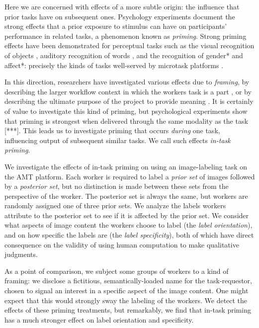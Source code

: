 \documentclass[a4paper]{report}
\begin{document}
Here we are concerned with effects of a more subtle origin: the influence that
prior tasks have on subsequent ones.  Psychology experiments document the 
strong effects that a prior exposure to stimulus can have on participants' 
performance in related tasks, a phenomenon known as \textit{priming}.  Strong 
priming effects have been demonstrated for
perceptual tasks such as the visual recognition of 
objects \cite{BJOP:BJOP1796},
auditory recognition of words \cite{BJOP:BJOP1826}, and the recognition
of gender* and affect*: precisely the kinds of tasks well-served by microtask 
platforms \cite{yuen2011survey, snow2008cheap}.  

In this direction, researchers have investigated various effects due to 
\textit{framing}, by describing the larger workflow context in which the 
workers task is a part \cite{Kinnaird2012281}, or by describing the ultimate 
purpose of the project to provide meaning \cite{chandler2013breaking}.
It is certainly of value to investigate this kind of priming, but 
psychological experiments show that priming is strongest when 
delivered through the same modality as the task [***].  This leads us to 
investigate priming that occurs \textit{during} one task, influencing output
of subsequent similar tasks. We call such effects \textit{in-task priming}.  

We investigate the effects of in-task priming on using an image-labeling task
on the AMT platform.  Each worker is required to label a \textit{prior set} of
images followed by a \textit{posterior set}, but no distinction is made between
these sets from the perspective of the worker.  The posterior set is
always the same, but workers are randomly assigned one of three prior sets.
We analyze the labels workers attribute to the posterior set to see if it is 
affected by the prior set.  We consider what aspects of image content the 
workers choose to label (the \textit{label orientation}), and on how specific 
the labels are (the \textit{label specificity}), both of which have direct 
consequence on the validity of using human computation to make qualitative 
judgments.

As a point of comparison, we subject some groups of workers to a kind of
framing: we disclose a fictitious, semantically-loaded name for the 
task-requestor, chosen to signal an interest in a specific aspect of the 
image content.  One might expect that this would strongly sway the labeling 
of the workers.  We detect the effects of these priming treatments, but 
remarkably, we find that in-task priming has a much stronger effect on label 
orientation and specificity.  
\end{document}
